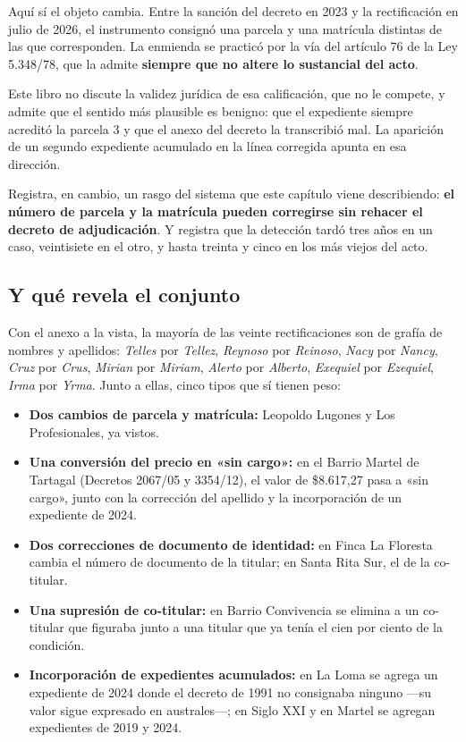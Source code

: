 \begin{cautela}
Aquí sí el objeto cambia. Entre la sanción del decreto en 2023 y la rectificación en julio de 2026, el instrumento consignó una parcela y una matrícula distintas de las que corresponden. La enmienda se practicó por la vía del artículo 76 de la Ley 5.348/78, que la admite \textbf{siempre que no altere lo sustancial del acto}.

Este libro no discute la validez jurídica de esa calificación, que no le compete, y admite que el sentido más plausible es benigno: que el expediente siempre acreditó la parcela 3 y que el anexo del decreto la transcribió mal. La aparición de un segundo expediente acumulado en la línea corregida apunta en esa dirección.

Registra, en cambio, un rasgo del sistema que este capítulo viene describiendo: \textbf{el número de parcela y la matrícula pueden corregirse sin rehacer el decreto de adjudicación}. Y registra que la detección tardó tres años en un caso, veintisiete en el otro, y hasta treinta y cinco en los más viejos del acto.
\end{cautela}

\subsection*{Y qué revela el conjunto}

Con el anexo a la vista, la mayoría de las veinte rectificaciones son de grafía de nombres y apellidos: \textit{Telles} por \textit{Tellez}, \textit{Reynoso} por \textit{Reinoso}, \textit{Nacy} por \textit{Nancy}, \textit{Cruz} por \textit{Crus}, \textit{Mirian} por \textit{Miriam}, \textit{Alerto} por \textit{Alberto}, \textit{Exequiel} por \textit{Ezequiel}, \textit{Irma} por \textit{Yrma}. Junto a ellas, cinco tipos que sí tienen peso:

\begin{itemize}[leftmargin=*]
\item \textbf{Dos cambios de parcela y matrícula:} Leopoldo Lugones y Los Profesionales, ya vistos.
\item \textbf{Una conversión del precio en «sin cargo»:} en el Barrio Martel de Tartagal (Decretos 2067/05 y 3354/12), el valor de \$8.617,27 pasa a «sin cargo», junto con la corrección del apellido y la incorporación de un expediente de 2024.
\item \textbf{Dos correcciones de documento de identidad:} en Finca La Floresta cambia el número de documento de la titular; en Santa Rita Sur, el de la co-titular.
\item \textbf{Una supresión de co-titular:} en Barrio Convivencia se elimina a un co-titular que figuraba junto a una titular que ya tenía el cien por ciento de la condición.
\item \textbf{Incorporación de expedientes acumulados:} en La Loma se agrega un expediente de 2024 donde el decreto de 1991 no consignaba ninguno ---su valor sigue expresado en australes---; en Siglo XXI y en Martel se agregan expedientes de 2019 y 2024.
\end{itemize}

